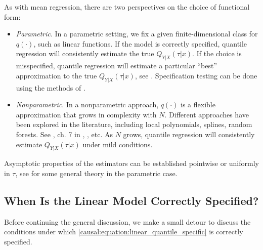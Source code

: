  As with mean regression, there are two perspectives on the choice of functional form:
\begin{itemize}
	\item \emph{Parametric}. In a parametric setting, we fix a given finite-dimensional class  for $q(\cdot)$, such as linear functions.
If the model is correctly specified, quantile regression will consistently estimate the true $Q_{Y|X}(\tau|x)$. 
If the choice is misspecified, quantile regression will estimate a particular ``best'' approximation  to the true $Q_{Y|X}(\tau|x)$, see 	 \cite{Angrist2006QuantileRegressionMisspecification}. Specification testing can be done using the methods of \cite{Rothe2013MisspecificationTestingClass}.
	\item \emph{Nonparametric}. In a nonparametric approach, $q(\cdot)$ is a flexible approximation that grows in complexity with $N$. Different approaches have been explored in the literature, including local polynomials, splines, random forests. See
	\cite{Koenker1994QuantileSmoothingSplines}, ch. 7 in \cite{Koenker2005},
	\cite{Meinshausen2006QuantileRegressionForests}, etc. As $N$ grows, quantile regression will consistently estimate $Q_{Y|X}(\tau|x)$ under mild conditions. 
	
\end{itemize}
  Asymptotic properties of the estimators can be established pointwise or uniformly in $\tau$, see \citep{Angrist2006QuantileRegressionMisspecification} for some general theory in the parametric case.
   

\subsection{When Is the Linear Model Correctly Specified?}

Before continuing the general discussion, we make a small detour to discuss the conditions under which \eqref{causal:equation:linear_quantile_specific} is correctly specified.


